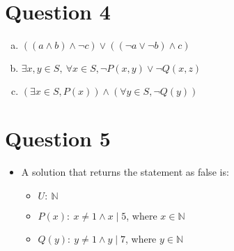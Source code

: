 \documentclass[12pt]{article}
\begin{document}
\section*{Question 4}
\begin{enumerate}[a.]
    \item $((a \land b) \land \neg c) \lor ((\neg a \lor \neg b) \land c)$
    \item $\exists x,y \in S,\:\forall x \in S, \neg P(x,y) \lor \neg Q(x,z)$
    \item $(\exists x \in S, P(x)) \land (\forall y \in S, \neg Q(y))$
\end{enumerate}

\section*{Question 5}
\begin{itemize}
    \item

    A solution that returns the statement as false is:

    \begin{itemize}
        \item $U:\:\mathbb{N}$
        \item $P(x):\:x \neq 1 \land x \mid 5$, where $x \in \mathbb{N}$
        \item $Q(y):\:y \neq 1 \land y \mid 7$, where $y \in \mathbb{N}$
    \end{itemize}
\end{itemize}
\end{document}
